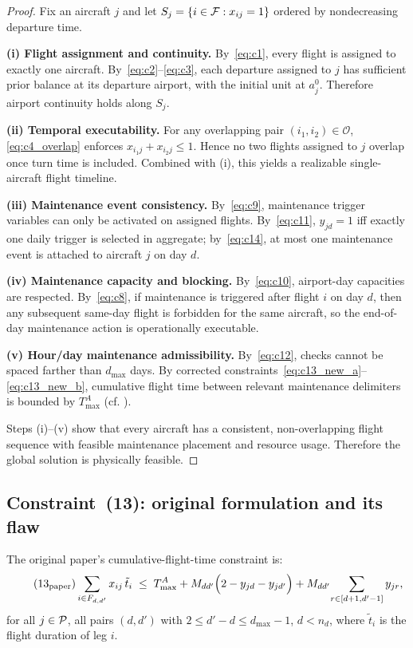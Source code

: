 \begin{proof}
  Fix an aircraft $j$ and let
  $S_j=\{i\in\mathcal{F}: x_{ij}=1\}$ ordered by nondecreasing departure time.

  \textbf{(i) Flight assignment and continuity.}
  By~\eqref{eq:c1}, every flight is assigned to exactly one aircraft.
  By~\eqref{eq:c2}--\eqref{eq:c3}, each departure assigned to $j$ has sufficient
  prior balance at its departure airport, with the initial unit at $a^0_j$.
  Therefore airport continuity holds along $S_j$.

  \textbf{(ii) Temporal executability.}
  For any overlapping pair $(i_1,i_2)\in\mathcal{O}$,
  \eqref{eq:c4_overlap} enforces $x_{i_1j}+x_{i_2j}\le 1$.
  Hence no two flights assigned to $j$ overlap once turn time is included.
  Combined with (i), this yields a realizable single-aircraft flight timeline.

  \textbf{(iii) Maintenance event consistency.}
  By~\eqref{eq:c9}, maintenance trigger variables can only be activated on
  assigned flights. By~\eqref{eq:c11}, $y_{jd}=1$ iff exactly one daily trigger
  is selected in aggregate; by~\eqref{eq:c14}, at most one maintenance event is
  attached to aircraft $j$ on day $d$.

  \textbf{(iv) Maintenance capacity and blocking.}
  By~\eqref{eq:c10}, airport-day capacities are respected. By~\eqref{eq:c8}, if
  maintenance is triggered after flight $i$ on day $d$, then any subsequent
  same-day flight is forbidden for the same aircraft, so the end-of-day
  maintenance action is operationally executable.

  \textbf{(v) Hour/day maintenance admissibility.}
  By~\eqref{eq:c12}, checks cannot be spaced farther than $d_{\max}$ days.
  By corrected constraints~\eqref{eq:c13_new_a}--\eqref{eq:c13_new_b},
  cumulative flight time between relevant maintenance delimiters is bounded by
  $T^A_{\max}$ (cf. ).

  Steps (i)--(v) show that every aircraft has a consistent, non-overlapping
  flight sequence with feasible maintenance placement and resource usage.
  Therefore the global solution is physically feasible.
\end{proof}

\subsection{Constraint~(13): original formulation and its flaw}
\label{subsec:c13_flaw}

The original paper's cumulative-flight-time constraint is:
\begin{equation}\label{eq:c13_paper}
  \tag{13$_{\mathrm{paper}}$}
  \sum_{i \in F_{d,d'}} x_{ij}\,\tilde{t}_i
  \;\le\;
  T^A_{\max}
  + M_{dd'}\Bigl(2 - y_{jd} - y_{jd'}\Bigr)
  + M_{dd'}\!\sum_{r \in [d+1,d'-1]} y_{jr},
\end{equation}
for all $j \in \mathcal{P}$, all pairs $(d, d')$ with $2 \le d'-d \le d_{\max}-1$,
$d < n_d$, where $\tilde{t}_i$ is the flight duration of leg $i$.

